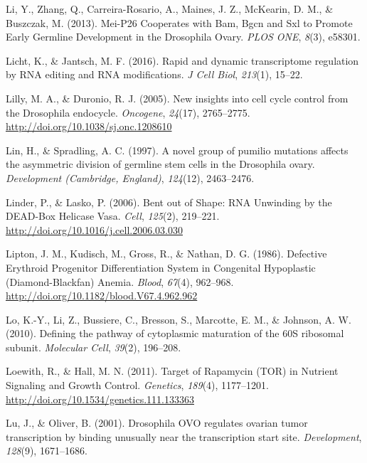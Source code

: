 \documentclass[12pt,oneside]{reedthesis}
\newlength{\cslhangindent}
\newenvironment{cslreferences}%
  {\setlength{\parindent}{0pt}%
  \everypar{\setlength{\hangindent}{\cslhangindent}}\ignorespaces}%
  {\par}
\begin{document}
\begin{cslreferences}
\leavevmode\hypertarget{ref-Li2013h}{}%
Li, Y., Zhang, Q., Carreira-Rosario, A., Maines, J. Z., McKearin, D. M., \& Buszczak, M. (2013). Mei-P26 Cooperates with Bam, Bgcn and Sxl to Promote Early Germline Development in the Drosophila Ovary. \emph{PLOS ONE}, \emph{8}(3), e58301.

\leavevmode\hypertarget{ref-Licht2016}{}%
Licht, K., \& Jantsch, M. F. (2016). Rapid and dynamic transcriptome regulation by RNA editing and RNA modifications. \emph{J Cell Biol}, \emph{213}(1), 15--22.

\leavevmode\hypertarget{ref-Lilly2005d}{}%
Lilly, M. A., \& Duronio, R. J. (2005). New insights into cell cycle control from the Drosophila endocycle. \emph{Oncogene}, \emph{24}(17), 2765--2775. \url{http://doi.org/10.1038/sj.onc.1208610}

\leavevmode\hypertarget{ref-Lin1997b}{}%
Lin, H., \& Spradling, A. C. (1997). A novel group of pumilio mutations affects the asymmetric division of germline stem cells in the Drosophila ovary. \emph{Development (Cambridge, England)}, \emph{124}(12), 2463--2476.

\leavevmode\hypertarget{ref-Linder2006}{}%
Linder, P., \& Lasko, P. (2006). Bent out of Shape: RNA Unwinding by the DEAD-Box Helicase Vasa. \emph{Cell}, \emph{125}(2), 219--221. \url{http://doi.org/10.1016/j.cell.2006.03.030}

\leavevmode\hypertarget{ref-liptonDefectiveErythroidProgenitor1986}{}%
Lipton, J. M., Kudisch, M., Gross, R., \& Nathan, D. G. (1986). Defective Erythroid Progenitor Differentiation System in Congenital Hypoplastic (Diamond-Blackfan) Anemia. \emph{Blood}, \emph{67}(4), 962--968. \url{http://doi.org/10.1182/blood.V67.4.962.962}

\leavevmode\hypertarget{ref-Lo2010a}{}%
Lo, K.-Y., Li, Z., Bussiere, C., Bresson, S., Marcotte, E. M., \& Johnson, A. W. (2010). Defining the pathway of cytoplasmic maturation of the 60S ribosomal subunit. \emph{Molecular Cell}, \emph{39}(2), 196--208.

\leavevmode\hypertarget{ref-loewithTargetRapamycinTOR2011}{}%
Loewith, R., \& Hall, M. N. (2011). Target of Rapamycin (TOR) in Nutrient Signaling and Growth Control. \emph{Genetics}, \emph{189}(4), 1177--1201. \url{http://doi.org/10.1534/genetics.111.133363}

\leavevmode\hypertarget{ref-Lu2001}{}%
Lu, J., \& Oliver, B. (2001). Drosophila OVO regulates ovarian tumor transcription by binding unusually near the transcription start site. \emph{Development}, \emph{128}(9), 1671--1686.


\end{cslreferences}
\end{document}
